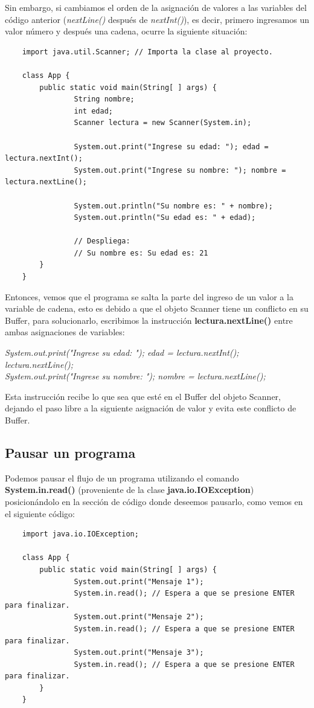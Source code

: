 Sin embargo, si cambiamos el orden de la asignación de valores a las variables del código anterior (\textit{nextLine()} después de \textit{nextInt()}), es decir, primero ingresamos un valor número y después una cadena, ocurre la siguiente situación:
\begin{lstlisting}
    import java.util.Scanner; // Importa la clase al proyecto.

    class App {
        public static void main(String[ ] args) {
        		String nombre;
        		int edad;
        		Scanner lectura = new Scanner(System.in);
        		
        		System.out.print("Ingrese su edad: "); edad = lectura.nextInt();
        		System.out.print("Ingrese su nombre: "); nombre = lectura.nextLine();
        		
        		System.out.println("Su nombre es: " + nombre);
        		System.out.println("Su edad es: " + edad);
        		
        		// Despliega:
        		// Su nombre es: Su edad es: 21
        }
    }
\end{lstlisting}

Entonces, vemos que el programa se salta la parte del ingreso de un valor a la variable de cadena, esto es debido a que el objeto Scanner tiene un conflicto en su Buffer, para solucionarlo, escribimos la instrucción \textbf{lectura.nextLine()} entre ambas asignaciones de variables:
\begin{center}
	\textit{
		System.out.print("Ingrese su edad: "); edad = lectura.nextInt(); \\
		lectura.nextLine(); \\
		System.out.print("Ingrese su nombre: "); nombre = lectura.nextLine();
	}
\end{center}

Esta instrucción recibe lo que sea que esté en el Buffer del objeto Scanner, dejando el paso libre a la siguiente asignación de valor y evita este conflicto de Buffer.


\subsection{Pausar un programa}
\hspace{0.55cm}Podemos pausar el flujo de un programa utilizando el comando \textbf{System.in.read()} (proveniente de la clase \textbf{java.io.IOException}) posicionándolo en la sección de código donde deseemos pausarlo, como vemos en el siguiente código:
\begin{lstlisting}
	import java.io.IOException;

    class App {
        public static void main(String[ ] args) {
        		System.out.print("Mensaje 1");
        		System.in.read(); // Espera a que se presione ENTER para finalizar.
        		System.out.print("Mensaje 2");
        		System.in.read(); // Espera a que se presione ENTER para finalizar.
        		System.out.print("Mensaje 3");
        		System.in.read(); // Espera a que se presione ENTER para finalizar.
        }
    }
\end{lstlisting}

